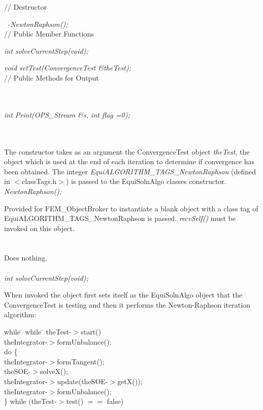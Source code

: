 // Destructor 

{\em ~ $\tilde{}$NewtonRaphson();}\\  

// Public Member Functions 

{\em int solveCurrentStep(void);} 

{\em void setTest(ConvergenceTest \&theTest);} \\ 

// Public Methods  for Output 

\\ 
\\ 
{\em int Print(OPS_Stream \&s, int flag =0);} 


 \\ 
\\ 
The constructor takes as an argument the ConvergenceTest object {\em
theTest}, the object which is used at the end of each iteration to
determine if convergence has been obtained. The
integer {\em EquiALGORITHM\_TAGS\_NewtonRaphson} (defined in
$<$classTags.h$>$) is passed to the EquiSolnAlgo classes
constructor. \\ 

{\em NewtonRaphson();}

Provided for FEM\_ObjectBroker to instantiate a blank object with a
class tag of EquiALGORITHM\_TAGS\_NewtonRaphson is passed. {\em
recvSelf()} must be invoked on this object. \\

 \\
\\ 
Does nothing. \\

  \\
{\em int solveCurrentStep(void);} 

When invoked the object first sets itself as the EquiSolnAlgo object
that the ConvergenceTest is testing and then it performs the
Newton-Raphson iteration algorithm: 
\begin{tabbing}
while \= \+ while \= \kill
theTest-$>$start() \\
theIntegrator-$>$formUnbalance(); \\
do \{ \+ \\
theIntegrator-$>$formTangent(); \\
theSOE-$>$solveX(); \\
theIntegrator-$>$update(theSOE-$>$getX()); \\
theIntegrator-$>$formUnbalance(); \- \\
\} while (theTest-$>$test() $==$ false)\- 
\end{tabbing}

